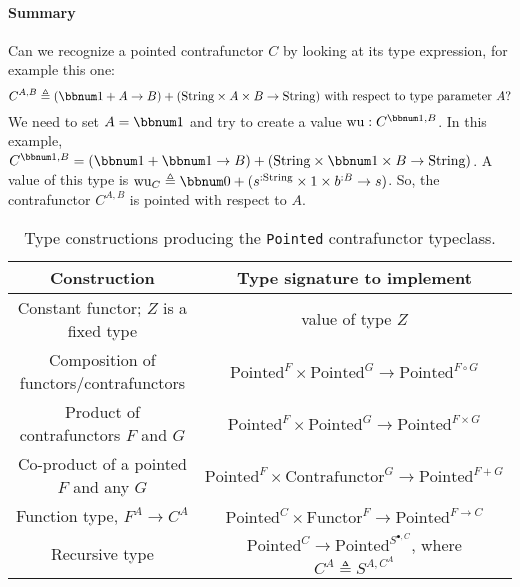 \paragraph{Summary}

Can we recognize a pointed contrafunctor $C$ by looking at its type
expression, for example this one:
\[
C^{A,B}\triangleq\left(\bbnum 1+A\rightarrow B\right)+(\text{String}\times A\times B\rightarrow\text{String})\text{ with respect to type parameter }A?
\]
We need to set $A=\bbnum 1$ and try to create a value $\text{wu}:C^{\bbnum 1,B}$.
In this example, $C^{\bbnum 1,B}=\left(\bbnum 1+\bbnum 1\rightarrow B\right)+(\text{String}\times\bbnum 1\times B\rightarrow\text{String})$.
A value of this type is $\text{wu}_{C}\triangleq\bbnum 0+(s^{:\text{String}}\times1\times b^{:B}\rightarrow s)$.
So, the contrafunctor $C^{A,B}$ is pointed with respect to $A$.

\begin{table}
\begin{centering}
\begin{tabular}{|c|c|}
\hline 
\textbf{\footnotesize{}Construction} & \textbf{\footnotesize{}Type signature to implement}\tabularnewline
\hline 
\hline 
{\footnotesize{}Constant functor; $Z$ is a fixed type} & {\footnotesize{}value of type $Z$}\tabularnewline
\hline 
{\footnotesize{}Composition of functors/contrafunctors} & {\footnotesize{}$\text{Pointed}^{F}\times\text{Pointed}^{G}\rightarrow\text{Pointed}^{F\circ G}$}\tabularnewline
\hline 
{\footnotesize{}Product of contrafunctors $F$ and $G$} & {\footnotesize{}$\text{Pointed}^{F}\times\text{Pointed}^{G}\rightarrow\text{Pointed}^{F\times G}$}\tabularnewline
\hline 
{\footnotesize{}Co-product of a pointed $F$ and any $G$} & {\footnotesize{}$\text{Pointed}^{F}\times\text{Contrafunctor}^{G}\rightarrow\text{Pointed}^{F+G}$}\tabularnewline
\hline 
{\footnotesize{}Function type, $F^{A}\rightarrow C^{A}$} & {\footnotesize{}$\text{Pointed}^{C}\times\text{Functor}^{F}\rightarrow\text{Pointed}^{F\rightarrow C}$}\tabularnewline
\hline 
{\footnotesize{}Recursive type} & {\footnotesize{}$\text{Pointed}^{C}\rightarrow\text{Pointed}^{S^{\bullet,C}}$,
where $C^{A}\triangleq S^{A,C^{A}}$}\tabularnewline
\hline 
\end{tabular}
\par\end{centering}
\caption{Type constructions producing the \lstinline!Pointed! contrafunctor
typeclass.\label{tab:Type-constructions-for-pointed-contrafunctor}}
\end{table}


